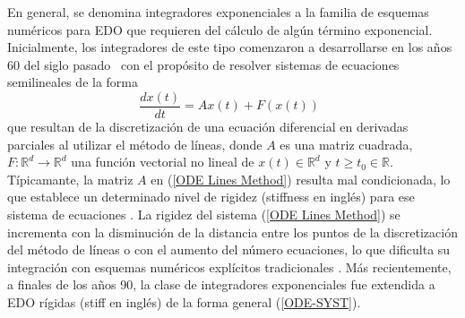 En general, se denomina integradores exponenciales a la familia
de esquemas numéricos para EDO que requieren del cálculo de algún término exponencial. Inicialmente, los integradores de este tipo comenzaron a desarrollarse en los años 60 del siglo pasado~\cite{Berland07} con el propósito de resolver sistemas de ecuaciones semilineales de la forma
\begin{equation}
\frac{dx(t)}{dt} = Ax(t) + F(x(t))  \;\;  \label{ODE Lines Method}
\end{equation}
que resultan de la discretización de una ecuación diferencial en derivadas parciales al utilizar el método de líneas, donde $A$ es una
matriz cuadrada, $F: \mathbb{R}^d\to\mathbb{R}^d$ una función vectorial no lineal de $x(t)\in\mathbb{R}^d$ y $t\geq t_0 \in \mathbb{R}$. Típicamante, la matriz $A$ en (\ref{ODE Lines Method}) resulta mal condicionada, lo que establece un determinado nivel de rigidez (stiffness en inglés) para ese sistema de ecuaciones \cite{schiesser2012}. La rigidez del sistema (\ref{ODE Lines Method}) se incrementa con la disminución de la distancia entre los puntos de la discretización del método de líneas o con el aumento del número ecuaciones, lo que dificulta su integración con esquemas numéricos explícitos tradicionales \cite{schiesser2012}. Más recientemente, a finales de los años 90, la clase de integradores exponenciales fue extendida a EDO rígidas (stiff en inglés) de la forma general (\ref{ODE-SYST}).

